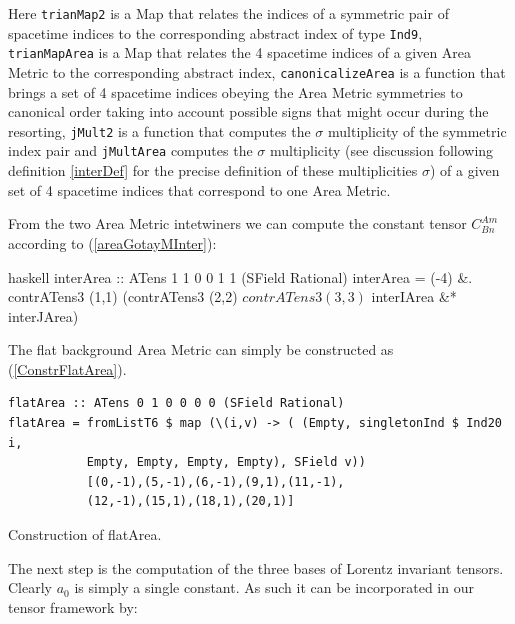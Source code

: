 \documentclass[a4paper,12pt, DIV=14, BCOR=5mm, twoside, headsepline, numbers=noenddot]{scrbook}
\begin{document}
Here \texttt{trianMap2} is a Map that relates the indices of a symmetric pair of spacetime indices to the corresponding abstract index of type \texttt{Ind9}, \texttt{trianMapArea} is a Map that relates the 4 spacetime indices of a given Area Metric to the corresponding abstract index, \texttt{canonicalizeArea} is a function that brings a set of 4 spacetime indices obeying the Area Metric symmetries to canonical order taking into account possible signs that might occur during the resorting, \texttt{jMult2} is a function that computes the $\sigma$ multiplicity of the symmetric index pair and \texttt{jMultArea} computes the $\sigma$ multiplicity (see discussion following definition \ref{interDef} for the precise definition of these multiplicities $\sigma$) of a given set of 4 spacetime indices that correspond to one Area Metric.

From the two Area Metric intetwiners we can compute the constant tensor $C^{Am}_{Bn}$ according to (\ref{areaGotayMInter}):

\begin{center}
\begin{cminted}{haskell}
interArea :: ATens 1 1 0 0 1 1 (SField Rational)
interArea = (-4) &. contrATens3 (1,1) (contrATens3 (2,2) $
            contrATens3 (3,3) $ interIArea &* interJArea)
\end{cminted}
\end{center}

The flat background Area Metric can simply be constructed as (\ref{ConstrFlatArea}).

\begin{listing}[hbt!]
\begin{verbatim}
flatArea :: ATens 0 1 0 0 0 0 (SField Rational)
flatArea = fromListT6 $ map (\(i,v) -> ( (Empty, singletonInd $ Ind20 i,
           Empty, Empty, Empty, Empty), SField v))
           [(0,-1),(5,-1),(6,-1),(9,1),(11,-1),
           (12,-1),(15,1),(18,1),(20,1)]
\end{verbatim} 
\caption{Construction of flatArea.}\label{ConstrFlatArea}
\end{listing}

The next step is the computation of the three bases of Lorentz invariant tensors. Clearly $a_0$ is simply a single constant. As such it can be incorporated in our tensor framework by:

\begin{center}
\end{center}
\end{document}
